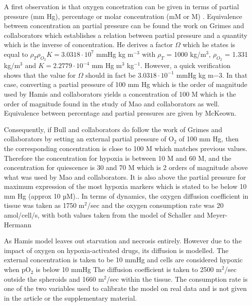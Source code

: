 \documentclass[11pt,a4paper]{article}
\begin{document}
A first observation is that oxygen concetration can be given in terms of partial pressure (mm Hg), percentage or molar concentration (mM or \textmu M) . Equivalence between concentration an partial pressure can be found the work on Grimes and collaborators which establishes a relation between partial pressure and a quantity which is the inverse of concentration. He derives a factor $\Omega$ which he states is equal to $ \rho_{T} \rho_{O_2} K = 3.0318 \cdot 10^7$ mmHg kg m$^{-3}$ with  $\rho_{T}$ = 1000 kg/m$^3$, $\rho_{O_2}$ = 1.331 kg/m$^3$ and $K = 2.2779 \cdot 10^{-4}$ mm Hg  m$^{3}$ kg$^{-1}$.\cite{Grimes2014} However, a quick verification shows that the value for $\Omega$ should in fact be $3.0318 \cdot 10^{-1}$ mmHg kg m${-3}$. In that case, converting a partial pressure of 100 mm Hg which is the order of magnitude used by Hamis and collaborators yields a concentration of 100 \textmu M which is the order of magnitude found in the study of Mao and collaborators as well. Equivalence between percentage and partial pressures are given by McKeown.\cite{McKeown2014} %

Consequently, if Bull and collaborators do follow the work of Grimes and collaborators by setting an external partial pressure of O${_2}$ of 100 mm Hg, then the corresponding concentration is close to 100 \textmu M which matches previous values. Therefore the concentration for hypoxia is between 10 \textmu M and 60 \textmu M, and the concentration for quiescence is 30 \textmu and 70 \textmu M which is 2 orders of magnitude above what was used by Mao and collaborators. It is also above the partial pressure for maximum expression of the most hypoxia markers which is stated to be below 10 mm Hg (approx 10 µM).\cite{Grimes2014}\cite{McKeown2014}. In terms of dynamics, the oxygen diffusion coefficient in tissue was taken as 1750 \textmu m$^2$/sec and the oxygen consumption rate was 20 amol/cell/s, with both values taken from the model of Schaller and Meyer-Hermann\cite{Kempf2005}

As Hamis model leaves out starvation and necrosis entirely. However due to the impact of oxygen on hypoxia-activated drugs, its diffusion is modelled. The external concentration is taken to be 10 mmHg and cells are considered hypoxic when pO$_2$ is below 10 mmHg The diffusion coefficient is taken to 2500 \textmu m$^2$/sec outside the spheroids and 1660 \textmu m$^2$/sec within the tissue. The consumption rate is one of the two variables used to calibrate the model on real data and is not given in the article or the supplementary material. 
\end{document}
